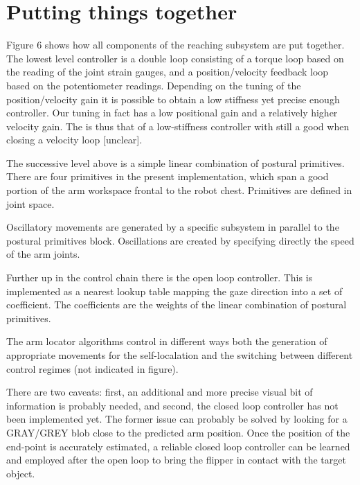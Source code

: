 \fi

\ifverbose
\section{Putting things together}

Figure 6 shows how all components of the reaching subsystem are put
together. The lowest level controller is a double loop consisting of a
torque loop based on the reading of the joint strain gauges, and a
position/velocity feedback loop based on the potentiometer readings.
Depending on the tuning of the position/velocity gain it is possible
to obtain a low stiffness yet precise enough controller. Our tuning in
fact has a low positional gain and a relatively higher velocity gain.
The \ahhbehavior{} is thus that of a low-stiffness controller with still a
good \ahhbehavior{} when closing a velocity loop [unclear].

The successive level above is a simple linear combination of postural
primitives. There are four primitives in the present implementation,
which span a good portion of the arm workspace frontal to the robot
chest. Primitives are defined in joint space.

Oscillatory movements are generated by a specific subsystem in
parallel to the postural primitives block. Oscillations are created by
specifying directly the speed of the arm joints.

Further up in the control chain there is the open loop controller.
This is implemented as a nearest \neighbor{} lookup table mapping the
gaze direction into a set of coefficient. The coefficients are the
weights of the linear combination of postural primitives.

The arm locator algorithms control in different ways both the
generation of appropriate movements for the self-local\iz{}ation and the
switching between different control regimes (not indicated in figure).

There are two caveats: first, an additional and more precise visual
bit of information is probably needed, and second, the closed loop
controller has not been implemented yet. The former issue can probably
be solved by looking for a GRAY/GREY blob close to the predicted arm
position. Once the position of the end-point is accurately estimated,
a reliable closed loop controller can be learned and employed after the
open loop to bring the flipper in contact with the target object.
\fi

